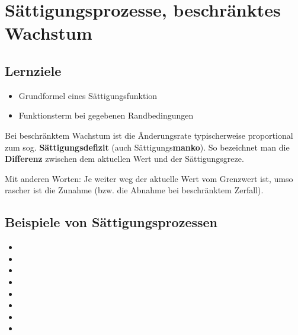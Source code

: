 \section{Sättigungsprozesse, beschränktes Wachstum}

\subsection*{Lernziele}
\begin{itemize}
	\item Grundformel eines Sättigungsfunktion
  \item Funktionsterm bei gegebenen Randbedingungen 
\end{itemize}

Bei beschränktem Wachstum ist die Änderungsrate typischerweise
proportional zum
sog. \textbf{Sättigungsdefizit}
(auch Sättigungs\textbf{manko}).
  So bezeichnet man die \textbf{Differenz} zwischen dem
  aktuellen Wert und der Sättigungsgreze.

Mit anderen Worten: Je weiter weg der aktuelle Wert vom Grenzwert ist, umso rascher ist die Zunahme (bzw. die Abnahme bei beschränktem Zerfall).

\subsection{Beispiele von Sättigungsprozessen}
\begin{itemize}
	\item {}
	\item {}
	\item {}
	\item {}
	\item {}
	\item {}
        \item {}
        \item \Lueckentext{\dotfill}
\end{itemize}
\newpage



